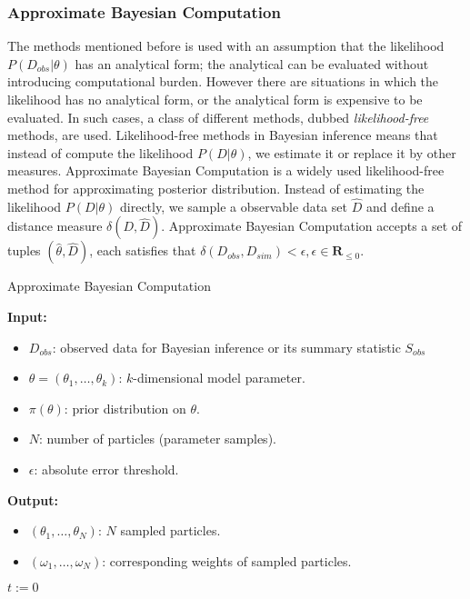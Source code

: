 \subsubsection{Approximate Bayesian Computation}
The methods mentioned before is used with an assumption that the likelihood $P(D_{obs}|\theta)$ has
an analytical form; the analytical can be evaluated without introducing computational burden.
However there are situations in which the likelihood has no analytical form, or the analytical form
is expensive to be evaluated. In such cases, a class of different methods, dubbed
\textit{likelihood-free} methods, are used. Likelihood-free methods in Bayesian inference means that
instead of compute the likelihood $P(D|\theta)$, we estimate it or replace it by other measures.
Approximate Bayesian Computation is a widely used likelihood-free method for approximating posterior
distribution. Instead of estimating the likelihood $P(D|\theta)$ directly, we sample a observable
data set $\hat{D}$ and define a distance measure $\delta(D, \hat{D})$. Approximate Bayesian
Computation accepts a set of tuples $(\hat{\theta}, \hat{D})$, each satisfies that
$\delta(D_{obs},D_{sim}) < \epsilon, \epsilon\in\mathbf{R}_{\leq 0}$.
\begin{algorithm}[H]
    \caption{Approximate Bayesian Computation}
    \label{abcalg}
    \hspace*{\algorithmicindent} \textbf{Input:}
    \begin{itemize}
        \item $D_{obs}$: observed data for Bayesian inference or its summary statistic $S_{obs}$
        \item $\theta=(\theta_1,\ldots,\theta_k)$: $k$-dimensional model parameter.
        \item $\pi(\theta)$: prior distribution on $\theta$.
        \item $N$: number of particles (parameter samples).
        \item $\epsilon$: absolute error threshold.
    \end{itemize}
    \hspace*{\algorithmicindent} \textbf{Output:}
    \begin{itemize}
        \item $(\theta_1,\ldots,\theta_N)$: $N$ sampled particles.
        \item $(\omega_1,\ldots,\omega_N)$: corresponding weights of sampled particles.
    \end{itemize}
    \begin{algorithmic}[1]
        \State $t:=0$  \EndWhile \EndProcedure
    \end{algorithmic}
\end{algorithm}



